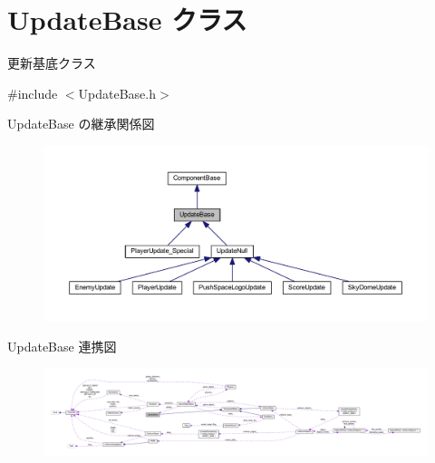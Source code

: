 \hypertarget{class_update_base}{}\section{Update\+Base クラス}
\label{class_update_base}


更新基底クラス  




{\ttfamily \#include $<$Update\+Base.\+h$>$}



Update\+Base の継承関係図\nopagebreak
\begin{figure}[H]
\begin{center}
\leavevmode
\includegraphics[width=350pt]{class_update_base__inherit__graph}
\end{center}
\end{figure}


Update\+Base 連携図\nopagebreak
\begin{figure}[H]
\begin{center}
\leavevmode
\includegraphics[width=350pt]{class_update_base__coll__graph}
\end{center}
\end{figure}
